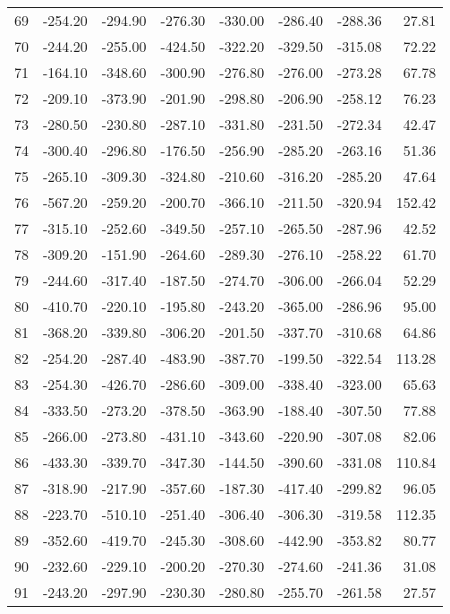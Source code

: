 \begin{longtable}{rrrrrrrr}
69 & -254.20 & -294.90 & -276.30 & -330.00 & -286.40 & -288.36 & 27.81  \\
70 & -244.20 & -255.00 & -424.50 & -322.20 & -329.50 & -315.08 & 72.22  \\
71 & -164.10 & -348.60 & -300.90 & -276.80 & -276.00 & -273.28 & 67.78  \\
72 & -209.10 & -373.90 & -201.90 & -298.80 & -206.90 & -258.12 & 76.23  \\
73 & -280.50 & -230.80 & -287.10 & -331.80 & -231.50 & -272.34 & 42.47  \\
74 & -300.40 & -296.80 & -176.50 & -256.90 & -285.20 & -263.16 & 51.36  \\
75 & -265.10 & -309.30 & -324.80 & -210.60 & -316.20 & -285.20 & 47.64  \\
76 & -567.20 & -259.20 & -200.70 & -366.10 & -211.50 & -320.94 & 152.42  \\
77 & -315.10 & -252.60 & -349.50 & -257.10 & -265.50 & -287.96 & 42.52  \\
78 & -309.20 & -151.90 & -264.60 & -289.30 & -276.10 & -258.22 & 61.70  \\
79 & -244.60 & -317.40 & -187.50 & -274.70 & -306.00 & -266.04 & 52.29  \\
80 & -410.70 & -220.10 & -195.80 & -243.20 & -365.00 & -286.96 & 95.00  \\
81 & -368.20 & -339.80 & -306.20 & -201.50 & -337.70 & -310.68 & 64.86  \\
82 & -254.20 & -287.40 & -483.90 & -387.70 & -199.50 & -322.54 & 113.28  \\
83 & -254.30 & -426.70 & -286.60 & -309.00 & -338.40 & -323.00 & 65.63  \\
84 & -333.50 & -273.20 & -378.50 & -363.90 & -188.40 & -307.50 & 77.88  \\
85 & -266.00 & -273.80 & -431.10 & -343.60 & -220.90 & -307.08 & 82.06  \\
86 & -433.30 & -339.70 & -347.30 & -144.50 & -390.60 & -331.08 & 110.84  \\
87 & -318.90 & -217.90 & -357.60 & -187.30 & -417.40 & -299.82 & 96.05  \\
88 & -223.70 & -510.10 & -251.40 & -306.40 & -306.30 & -319.58 & 112.35  \\
89 & -352.60 & -419.70 & -245.30 & -308.60 & -442.90 & -353.82 & 80.77  \\
90 & -232.60 & -229.10 & -200.20 & -270.30 & -274.60 & -241.36 & 31.08  \\
91 & -243.20 & -297.90 & -230.30 & -280.80 & -255.70 & -261.58 & 27.57  \\

\end{longtable}
